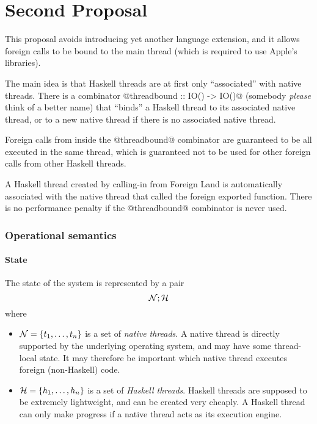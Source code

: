 \documentclass{article}
\newcommand{\NS}{{\cal N}}
\newcommand{\HS}{{\cal H}}
\begin{document}
\newpage
\part{Second Proposal}

This proposal avoids introducing yet another language extension, and it allows
foreign calls to be bound to the main thread (which is required to use Apple's
libraries).

The main idea is that Haskell threads are at first only ``associated'' with
native threads. There is a combinator @threadbound :: IO() -> IO()@ (somebody
\emph{please} think of a better name) that ``binds'' a Haskell thread to its
associated native thread, or to a new native thread if there is no associated
native thread.

Foreign calls from inside the @threadbound@ combinator are guaranteed to be all
executed in the same thread, which is guaranteed not to be used for other
foreign calls from other Haskell threads.

A Haskell thread created by calling-in from Foreign Land is automatically
associated with the native thread that called the foreign exported function.
There is no performance penalty if the @threadbound@ combinator is never used.

\section{Operational semantics}

\subsection{State}

The state of the system is represented by a pair
$$\NS ; \HS$$
where 
\begin{itemize}
\item $\NS = \{t_1, \ldots ,t_n\}$ is a set of \emph{native threads}.
A native thread is directly supported by the underlying operating
system, and may have some thread-local state. It may therefore
be important which native thread executes foreign
(non-Haskell) code.

\item $\HS = \{h_1, \ldots ,h_n\}$ is a set of \emph{Haskell threads}.
Haskell threads are supposed to be extremely lightweight, and
can be created very cheaply. A Haskell thread can only make progress
if a native thread acts as its execution engine.
\end{itemize}
\end{document}

